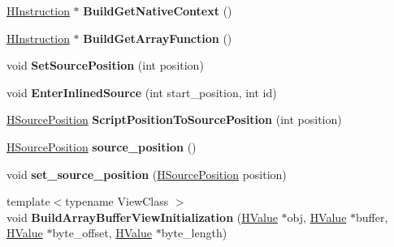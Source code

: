 \begin{DoxyCompactItemize}
\item 
\hypertarget{classv8_1_1internal_1_1_h_graph_builder_ae8fa222e5b82e7871d33e6b7480a273b}{}\hyperlink{classv8_1_1internal_1_1_h_instruction}{H\+Instruction} $\ast$ {\bfseries Build\+Get\+Native\+Context} ()\label{classv8_1_1internal_1_1_h_graph_builder_ae8fa222e5b82e7871d33e6b7480a273b}

\item 
\hypertarget{classv8_1_1internal_1_1_h_graph_builder_a0cffe26cdad67bac4fd40192d419ac1c}{}\hyperlink{classv8_1_1internal_1_1_h_instruction}{H\+Instruction} $\ast$ {\bfseries Build\+Get\+Array\+Function} ()\label{classv8_1_1internal_1_1_h_graph_builder_a0cffe26cdad67bac4fd40192d419ac1c}

\item 
\hypertarget{classv8_1_1internal_1_1_h_graph_builder_a341d6ca5e026323c79d5acbcc050f655}{}void {\bfseries Set\+Source\+Position} (int position)\label{classv8_1_1internal_1_1_h_graph_builder_a341d6ca5e026323c79d5acbcc050f655}

\item 
\hypertarget{classv8_1_1internal_1_1_h_graph_builder_a2a1bc7e9060908ced61ba3fbe2dc54a7}{}void {\bfseries Enter\+Inlined\+Source} (int start\+\_\+position, int id)\label{classv8_1_1internal_1_1_h_graph_builder_a2a1bc7e9060908ced61ba3fbe2dc54a7}

\item 
\hypertarget{classv8_1_1internal_1_1_h_graph_builder_a867e50da291c5c7b556979d137426130}{}\hyperlink{classv8_1_1internal_1_1_h_source_position}{H\+Source\+Position} {\bfseries Script\+Position\+To\+Source\+Position} (int position)\label{classv8_1_1internal_1_1_h_graph_builder_a867e50da291c5c7b556979d137426130}

\item 
\hypertarget{classv8_1_1internal_1_1_h_graph_builder_a4f2c24663ab1ad451f32809798743f5b}{}\hyperlink{classv8_1_1internal_1_1_h_source_position}{H\+Source\+Position} {\bfseries source\+\_\+position} ()\label{classv8_1_1internal_1_1_h_graph_builder_a4f2c24663ab1ad451f32809798743f5b}

\item 
\hypertarget{classv8_1_1internal_1_1_h_graph_builder_a1f545b7d08b6ab6b02d4af832f6cbb16}{}void {\bfseries set\+\_\+source\+\_\+position} (\hyperlink{classv8_1_1internal_1_1_h_source_position}{H\+Source\+Position} position)\label{classv8_1_1internal_1_1_h_graph_builder_a1f545b7d08b6ab6b02d4af832f6cbb16}

\item 
\hypertarget{classv8_1_1internal_1_1_h_graph_builder_a58038620b793b5af994a5bd5b601626e}{}{\footnotesize template$<$typename View\+Class $>$ }\\void {\bfseries Build\+Array\+Buffer\+View\+Initialization} (\hyperlink{classv8_1_1internal_1_1_h_value}{H\+Value} $\ast$obj, \hyperlink{classv8_1_1internal_1_1_h_value}{H\+Value} $\ast$buffer, \hyperlink{classv8_1_1internal_1_1_h_value}{H\+Value} $\ast$byte\+\_\+offset, \hyperlink{classv8_1_1internal_1_1_h_value}{H\+Value} $\ast$byte\+\_\+length)\label{classv8_1_1internal_1_1_h_graph_builder_a58038620b793b5af994a5bd5b601626e}

\end{DoxyCompactItemize}


